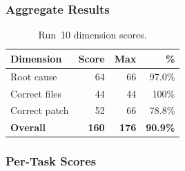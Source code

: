 \subsubsection{Aggregate Results}

\begin{table}[h]
\centering
\caption{Run~10 dimension scores.}\label{tab:r10-dim}
\begin{tabular}{lrrr}
\toprule
\textbf{Dimension} & \textbf{Score} & \textbf{Max} & \textbf{\%} \\
\midrule
Root cause         & 64 & 66 & 97.0\% \\
Correct files      & 44 & 44 & 100\%  \\
Correct patch      & 52 & 66 & 78.8\% \\
\midrule
\textbf{Overall}   & \textbf{160} & \textbf{176} & \textbf{90.9\%} \\
\bottomrule
\end{tabular}
\end{table}

\subsubsection{Per-Task Scores}

